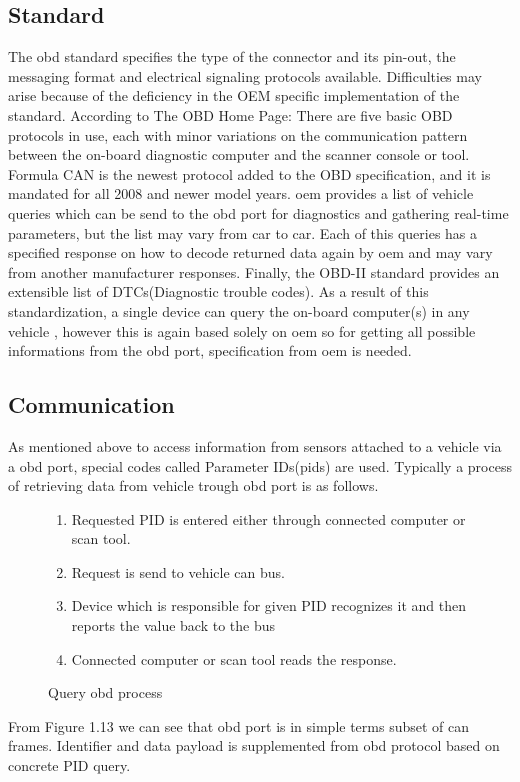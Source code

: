 \subsection{Standard}
The \gls{obd} standard specifies the type of the connector and its pin-out, the messaging format and electrical signaling protocols available. Difficulties may arise because of the deficiency in the OEM specific implementation of the standard. According to The OBD Home Page: There are five basic OBD protocols in use, each with minor variations on the communication pattern between the on-board diagnostic computer and the scanner console or tool. Formula CAN is the newest protocol added to the OBD specification, and it is mandated for all 2008 and newer model years\cite{7223296}. \gls{oem} provides a list of vehicle queries which can be send to the \gls{obd} port for diagnostics and gathering real-time parameters, but the list may vary from car to car. Each of this queries has a specified response on how to decode returned data again by \gls{oem} and may vary from another manufacturer responses. Finally, the OBD-II standard provides an extensible list of DTCs(Diagnostic trouble codes). As a result of this standardization, a single device can query the on-board computer(s) in any vehicle \cite{obdiso}, however this is again based solely on \gls{oem} so for getting all possible informations from the \gls{obd} port, specification from \gls{oem} is needed.
\subsection{Communication}
As mentioned above to access information from sensors attached to a vehicle via a \gls{obd} port, special codes called Parameter IDs(\gls{pids}) are used. Typically a process of retrieving data from vehicle trough \gls{obd} port is as follows.
\begin{figure}[H]
\begin{center}
\begin{enumerate}
	\item Requested PID is entered either through connected computer or scan tool.
	\item Request is send to vehicle \gls{can} bus.
	\item Device which is responsible for given PID recognizes it and then reports the value back to the bus
	\item Connected computer or scan tool reads the response.
\end{enumerate}
\captionsetup{font=small}
\label{fig:bul1}
\caption{Query \gls{obd} process}
\end{center}
\end{figure}
From Figure 1.13 we can see that \gls{obd} port is in simple terms subset of \gls{can} frames. Identifier and data payload is supplemented from \gls{obd} protocol based on concrete PID query.
